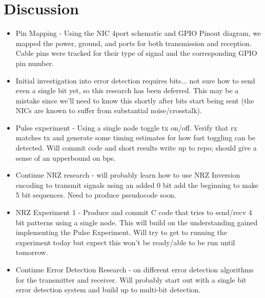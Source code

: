 \documentclass{article}
\begin{document}
\section*{Discussion}
\begin{itemize}
\item Pin Mapping - Using the NIC 4port schematic and GPIO Pinout diagram, we mapped the power, ground, and ports for both transmission and reception. Cable pins were tracked for their type of signal and the corresponding GPIO pin number.
\item Initial investigation into error detection requires bits... not sure how to
send even a single bit yet, so this research has been deferred. This may be a
mistake since we'll need to know this shortly after bits start being sent (the NICs
are known to suffer from substantial noise/crosstalk).
\item Pulse experiment - Using a single node toggle tx on/off. Verify that rx
matches tx and generate some timing estimates for how fast toggling can be
detected. Will commit code and short results write up to repo; should give a sense of an upperbound on bps.
\item Continue NRZ research - will probably learn how to use NRZ Inversion encoding to transmit signals using an added 0 bit add the beginning to make 5 bit sequences. Need to produce pseudocode soon.
\item NRZ Experiment 1 - Produce and commit C code that tries to send/recv 4 bit patterns using a single node. This will build on the understanding gained implementing the Pulse Experiment. Will try to get to running the experiment today but expect this won't be ready/able to be run until tomorrow.
\item Continue Error Detection Research - on different error detection algorithms for the transmitter and receiver. Will probably start out with a single bit error detection system and build up to multi-bit detection.
\end{itemize}
\end{document}
